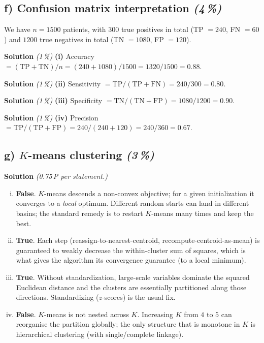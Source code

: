 \documentclass[11pt,a4paper]{article}
\newcommand{\subpoints}[1]{\textit{(#1\,\%)}}
\newcommand{\sol}{\noindent\textbf{Solution}}
\begin{document}
\subsection*{f) Confusion matrix interpretation \subpoints{4}}

We have $n=1500$ patients, with $300$ true positives in total (TP $=240$, FN $=60$) and $1200$ true negatives
in total (TN $=1080$, FP $=120$).

\medskip
\sol{} \subpoints{1} \textbf{(i)} Accuracy $= (\text{TP}+\text{TN})/n
   = (240 + 1080)/1500 = 1320/1500 = \boxed{0.88}.$

\medskip
\sol{} \subpoints{1} \textbf{(ii)} Sensitivity $= \text{TP}/(\text{TP}+\text{FN})
   = 240/300 = \boxed{0.80}.$

\medskip
\sol{} \subpoints{1} \textbf{(iii)} Specificity $= \text{TN}/(\text{TN}+\text{FP})
   = 1080/1200 = \boxed{0.90}.$

\medskip
\sol{} \subpoints{1} \textbf{(iv)} Precision $= \text{TP}/(\text{TP}+\text{FP})
   = 240/(240+120) = 240/360 = \boxed{0.67}.$

\subsection*{g) $K$-means clustering \subpoints{3}}
\sol{} \emph{(0.75\,P per statement.)}
\begin{enumerate}[(i)]
  \item \textbf{False}. $K$-means descends a non-convex objective; for a given initialization it converges
        to a \emph{local} optimum. Different random starts can land in different basins; the standard
        remedy is to restart $K$-means many times and keep the best.
  \item \textbf{True}. Each step (reassign-to-nearest-centroid, recompute-centroid-as-mean) is guaranteed
        to weakly decrease the within-cluster sum of squares, which is what gives the algorithm its
        convergence guarantee (to a local minimum).
  \item \textbf{True}. Without standardization, large-scale variables dominate the squared Euclidean
        distance and the clusters are essentially partitioned along those directions. Standardizing
        ($z$-scores) is the usual fix.
  \item \textbf{False}. $K$-means is not nested across $K$. Increasing $K$ from $4$ to $5$ can reorganise
        the partition globally; the only structure that is monotone in $K$ is hierarchical clustering
        (with single/complete linkage).
\end{enumerate}
\end{document}
